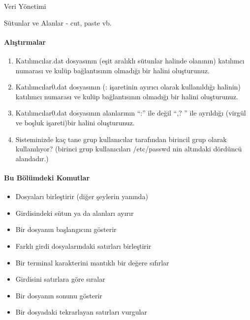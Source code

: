 \begin{section}{Veri Yönetimi}
\begin{subsection}{Sütunlar ve Alanlar - cut, paste vb.}
\paragraph{{\Huge{\PencilLeftDown}}Alıştırmalar}{
\begin{enumerate}
 \item Katılımcılar.dat dosyasının (eşit aralıklı sütunlar halinde olanının) katılımcı numarası ve kulüp bağlantısının olmadığı bir halini oluşturunuz.
 \item Katılımcılar0.dat dosyasının (: işaretinin ayırıcı olarak kullanıldığı halinin) katılımcı numarası ve kulüp bağlantısının olmadığı bir halini oluşturunuz.
 \item Katılımcılar0.dat dosyasının alanlarının “:” ile değil “,? ” ile ayrıldığı (virgül ve boşluk işareti)bir halini oluşturunuz.
 \item Sisteminizde kaç tane grup kullanıcılar tarafından birincil grup olarak kullanılıyor? (birinci grup kullanıcıları /etc/passwd nin altındaki dördüncü alandadır.)
\end{enumerate}}

\paragraph{Bu Bölümdeki Komutlar}{
\begin{itemize}
\item[cat]Dosyaları birleştirir (diğer şeylerin yanında)
\item[cut]Girdisindeki sütun ya da alanları ayırır
\item[head]Bir dosyanın başlangıcını gösterir
\item[paste]Farklı girdi dosyalarındaki satırları birleştirir
\item[reset]Bir terminal karakterini mantıklı bir değere sıfırlar
\item[sort]Girdisini satırlara göre sıralar
\item[tail]Bir dosyanın sonunu gösterir
\item[uniq]Bir dosyadaki tekrarlayan satırları vurgular
\end{itemize}}


\end{subsection}
\end{section}
